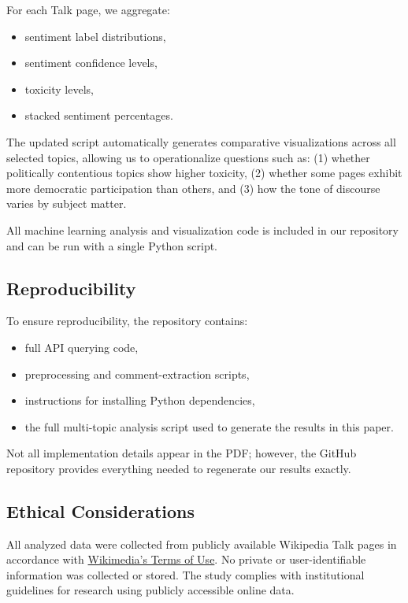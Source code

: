 For each Talk page, we aggregate:

\begin{itemize}
    \item sentiment label distributions,
    \item sentiment confidence levels,
    \item toxicity levels,
    \item stacked sentiment percentages.
\end{itemize}

The updated script automatically generates comparative visualizations across all selected topics, 
allowing us to operationalize questions such as:  
(1) whether politically contentious topics show higher toxicity,  
(2) whether some pages exhibit more democratic participation than others, and  
(3) how the tone of discourse varies by subject matter.

All machine learning analysis and visualization code is included in our repository and can be 
run with a single Python script.

\subsection{Reproducibility}

To ensure reproducibility, the repository contains:

\begin{itemize}
    \item full API querying code,  
    \item preprocessing and comment-extraction scripts,  
    \item instructions for installing Python dependencies,  
    \item the full multi-topic analysis script used to generate the results in this paper.
\end{itemize}

Not all implementation details appear in the PDF; however, the GitHub 
repository provides everything needed to regenerate our results exactly.

\subsection{Ethical Considerations}

All analyzed data were collected from publicly available Wikipedia Talk pages in accordance with 
\href{https://foundation.wikimedia.org/wiki/Policy:Terms_of_Use}{Wikimedia’s Terms of Use}. No private 
or user-identifiable information was collected or stored. The study complies with institutional 
guidelines for research using publicly accessible online data.